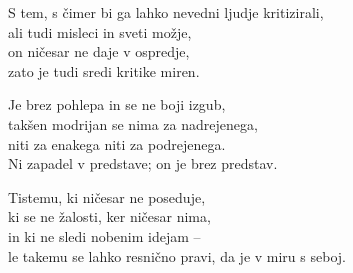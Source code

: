 S tem, s čimer bi ga lahko nevedni ljudje kritizirali,\\
ali tudi misleci in sveti možje,\\
on ničesar ne daje v ospredje,\\
zato je tudi sredi kritike miren.

Je brez pohlepa in se ne boji izgub,\\
takšen modrijan se nima za nadrejenega,\\
niti za enakega niti za podrejenega.\\
Ni zapadel v predstave; on je brez predstav.

Tistemu, ki ničesar ne poseduje,\\
ki se ne žalosti, ker ničesar nima,\\
in ki ne sledi nobenim idejam --\\
le takemu se lahko resnično pravi, da je v miru s seboj.

